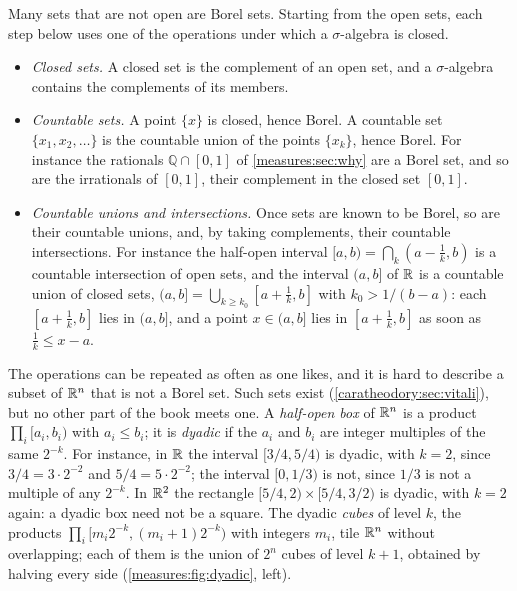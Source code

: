 \begin{notechapter}
Many sets that are not open are Borel sets. Starting from the open
sets, each step below uses one of the operations under which a
$\sigma$-algebra is closed.
\begin{itemize}[nosep]
  \item \emph{Closed sets.} A closed set is the complement of an open
        set, and a $\sigma$-algebra contains the complements of its
        members.
  \item \emph{Countable sets.} A point $\{x\}$ is closed, hence Borel.
        A countable set $\{x_1, x_2, \dots\}$ is the countable union of
        the points $\{x_k\}$, hence Borel. For instance the rationals
        $\mathbb Q\cap[0, 1]$ of \cref{measures:sec:why} are a Borel
        set, and so are the irrationals of $[0, 1]$, their complement in
        the closed set $[0, 1]$.
  \item \emph{Countable unions and intersections.} Once sets are known
        to be Borel, so are their countable unions, and, by taking
        complements, their countable intersections. For instance the
        half-open interval $[a, b) = \bigcap_k(a - \frac1k, b)$ is a
        countable intersection of open sets, and the interval $(a, b]$
        of $\mathbb{R}$ is a countable union of closed sets,
        $(a, b] = \bigcup_{k\geq k_0}[a + \frac1k, b]$ with
        $k_0 > 1/(b - a)$: each $[a + \frac1k, b]$ lies in $(a, b]$, and
        a point $x\in(a, b]$ lies in $[a + \frac1k, b]$ as soon as
        $\frac1k\leq x - a$.
\end{itemize}
The operations can be repeated as often as one likes, and it is hard
to describe a subset of $\mathbb{R}^n$ that is not a Borel set. Such sets
exist (\cref{caratheodory:sec:vitali}), but no other part of the book
meets one.
A \emph{half-open box} of $\mathbb{R}^n$ is a product
$\prod_i[a_i, b_i)$ with $a_i\leq b_i$; it is \emph{dyadic} if the $a_i$
and $b_i$ are integer multiples of the same $2^{-k}$.
For instance, in $\mathbb{R}$ the interval $[3/4, 5/4)$ is dyadic, with $k = 2$,
since $3/4 = 3\cdot2^{-2}$ and $5/4 = 5\cdot2^{-2}$; the interval
$[0, 1/3)$ is not, since $1/3$ is not a multiple of any $2^{-k}$. In
$\mathbb{R}^2$ the rectangle $[5/4, 2)\times[5/4, 3/2)$ is dyadic, with $k = 2$
again: a dyadic box need not be a square. The dyadic \emph{cubes} of
level $k$, the products $\prod_i[m_i2^{-k}, (m_i + 1)2^{-k})$ with
integers $m_i$, tile $\mathbb{R}^n$ without overlapping; each of them is the
union of $2^n$ cubes of level $k + 1$, obtained by halving every side
(\cref{measures:fig:dyadic}, left).


\end{notechapter}
